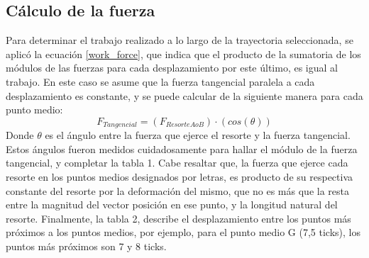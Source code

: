 \documentclass[../main.tex]{subfiles}
\begin{document}
\subsection{Cálculo de la fuerza}
Para determinar el trabajo realizado a lo largo de la 
trayectoria seleccionada, se aplicó la ecuación \ref{work_force}, 
que indica que el producto de la sumatoria de los módulos de las
 fuerzas para cada desplazamiento por este último, es igual 
 al trabajo. En este caso se asume que la fuerza tangencial 
 paralela a cada desplazamiento es constante, y se puede 
 calcular de la siguiente manera para cada punto medio:
\[F_{Tangencial}=(F_{Resorte A o B} )\cdot(cos(\theta))\]
Donde $\theta$ es el ángulo entre la fuerza que ejerce el resorte y la fuerza tangencial. Estos ángulos fueron medidos cuidadosamente para hallar el módulo de la fuerza tangencial, y completar la tabla 1.
Cabe resaltar que, la fuerza que ejerce cada resorte en los puntos medios designados por letras, es producto de su respectiva constante del resorte por la deformación del mismo, que no es más que la resta entre la magnitud del vector posición en ese punto, y la longitud natural del resorte. Finalmente, la tabla 2, describe el desplazamiento entre los puntos más próximos a los puntos medios, por ejemplo, para el punto medio G (7,5 ticks), los puntos más próximos son 7 y 8 ticks.
\end{document}
